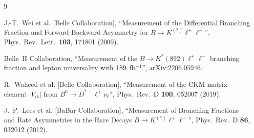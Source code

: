 \documentclass[11pt]{article}
\begin{document}
\begin{thebibliography}{9}

J.-T.~Wei et al. [Belle Collaboration],
``Measurement of the Differential Branching Fraction and Forward-Backward Asymmetry for $B\to K^{(*)}\ell^+\ell^-$'',
Phys.\ Rev.\ Lett.\ \textbf{103}, 171801 (2009).

Belle~II Collaboration,
``Measurement of the $B\to K^*(892)\ell^+\ell^-$ branching fraction and lepton universality with 189~fb$^{-1}$'',
arXiv:2206.05946.

R.~Waheed et al. [Belle Collaboration],
``Measurement of the CKM matrix element $|V_{cb}|$ from $B^0\to D^{*-}\ell^+\nu_\ell$'',
Phys.\ Rev.\ D \textbf{100}, 052007 (2019).

J.~P.~Lees et al. [BaBar Collaboration],
``Measurement of Branching Fractions and Rate Asymmetries in the Rare Decays $B\to K^{(*)}\ell^+\ell^-$'',
Phys.\ Rev.\ D \textbf{86}, 032012 (2012).

\end{thebibliography}
\end{document}
